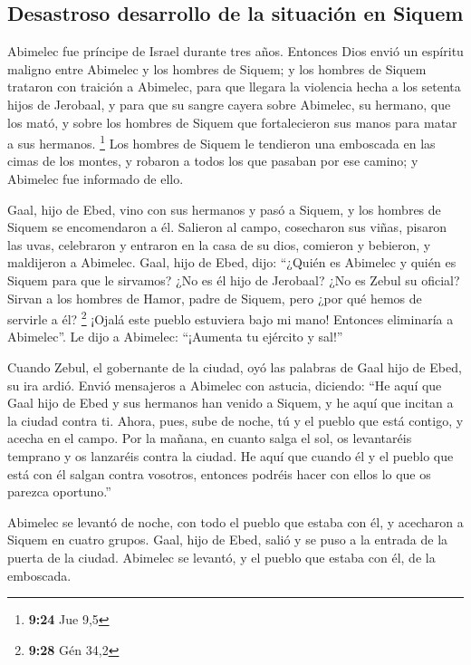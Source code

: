 \begin{paracol}{2}
\hypertarget{desastroso-desarrollo-de-la-situaciuxf3n-en-siquem}{%
\subsection{Desastroso desarrollo de la situación en
Siquem}\label{desastroso-desarrollo-de-la-situaciuxf3n-en-siquem}}

 Abimelec fue príncipe de Israel durante tres años.
 Entonces Dios envió un espíritu maligno entre Abimelec y
los hombres de Siquem; y los hombres de Siquem trataron con traición a
Abimelec,  para que llegara la violencia hecha a los
setenta hijos de Jerobaal, y para que su sangre cayera sobre Abimelec,
su hermano, que los mató, y sobre los hombres de Siquem que
fortalecieron sus manos para matar a sus hermanos. \footnote{\textbf{9:24}
  Jue 9,5}  Los hombres de Siquem le tendieron una
emboscada en las cimas de los montes, y robaron a todos los que pasaban
por ese camino; y Abimelec fue informado de ello.

 Gaal, hijo de Ebed, vino con sus hermanos y pasó a
Siquem, y los hombres de Siquem se encomendaron a él. 
Salieron al campo, cosecharon sus viñas, pisaron las uvas, celebraron y
entraron en la casa de su dios, comieron y bebieron, y maldijeron a
Abimelec.  Gaal, hijo de Ebed, dijo: ``¿Quién es Abimelec
y quién es Siquem para que le sirvamos? ¿No es él hijo de Jerobaal? ¿No
es Zebul su oficial? Sirvan a los hombres de Hamor, padre de Siquem,
pero ¿por qué hemos de servirle a él? \footnote{\textbf{9:28} Gén 34,2}
 ¡Ojalá este pueblo estuviera bajo mi mano! Entonces
eliminaría a Abimelec''. Le dijo a Abimelec: ``¡Aumenta tu ejército y
sal!''

 Cuando Zebul, el gobernante de la ciudad, oyó las
palabras de Gaal hijo de Ebed, su ira ardió.  Envió
mensajeros a Abimelec con astucia, diciendo: ``He aquí que Gaal hijo de
Ebed y sus hermanos han venido a Siquem, y he aquí que incitan a la
ciudad contra ti.  Ahora, pues, sube de noche, tú y el
pueblo que está contigo, y acecha en el campo.  Por la
mañana, en cuanto salga el sol, os levantaréis temprano y os lanzaréis
contra la ciudad. He aquí que cuando él y el pueblo que está con él
salgan contra vosotros, entonces podréis hacer con ellos lo que os
parezca oportuno.''

 Abimelec se levantó de noche, con todo el pueblo que
estaba con él, y acecharon a Siquem en cuatro grupos. 
Gaal, hijo de Ebed, salió y se puso a la entrada de la puerta de la
ciudad. Abimelec se levantó, y el pueblo que estaba con él, de la
emboscada.


\end{paracol}
